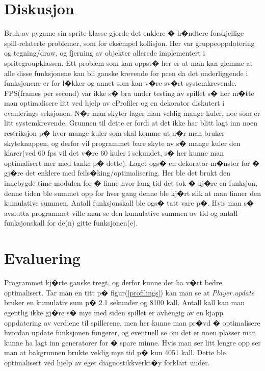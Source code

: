 {    \section{Diskusjon}

    Bruk av pygame sin sprite-klasse gjorde det enklere � h�ndtere forskjellige spill-relaterte problemer, som for eksempel kollisjon. Her var gruppeoppdatering og tegning/draw, og fjerning av objekter allerede implementert i spritegroupklassen. Ett problem som kan oppst� her er at man kan glemme at alle disse funksjonene kan bli ganske krevende for pcen da det underliggende i funksjonene er for l�kker og annet som kan v�re sv�rt systemkrevende. FPS(frames per second) var ikke s� bra under testing av spillet s� her m�tte man optimalisere litt ved hjelp av cProfiler og en dekorator diskutert i evaulerings-seksjonen. N�r man skyter lager man veldig mange kuler, noe som er litt systemkrevende. Grunnen til dette er fordi at det ikke har blitt lagt inn noen restriksjon p� hvor mange kuler som skal komme ut n�r man bruker skyteknappen, og derfor vil programmet bare skyte av s� mange kuler den klarer(ved 60 fps vil det v�re 60 kuler i sekundet, s� her kunne man optimalisert mer med tanke p� dette). Laget ogs� en dekorator-m�nster for � gj�re det enklere med feils�king/optimalisering. Her ble det brukt den innebygde time modulen for � finne hvor lang tid det tok � kj�re en funksjon, denne tiden ble summet opp for hver gang denne ble kj�rt slik at man finner den kumulative summen. Antall funksjonskall ble ogs� tatt vare p�. Hvis man s� avslutta programmet ville man se den kumulative summen av tid og antall funksjonskall for de(n) gitte funksjonen(e).

  


    \section{Evaluering}

    Programmet kj�rte ganske tregt, og derfor kunne det ha v�rt bedre optimalisert. Tar man en titt p� figur(\ref{profilings}) kan man se at \emph{Player.update} bruker en kumulativ sum p� 2.1 sekunder og 8100 kall. Antall kall kan man egentlig ikke gj�re s� mye med siden spillet er avhengig av en kjapp oppdatering av verdiene til spillerene, men her kunne man pr�vd � optimalisere hvordan update funksjonen fungerer, og eventuell se om det er noen plasser man kunne ha lagt inn generatorer for � spare minne. Hvis man ser litt lengre opp ser man at bakgrunnen brukte veldig mye tid p� kun 4051 kall. Dette ble optimalisert ved hjelp av eget diagnostikkverkt�y forklart under.

}
